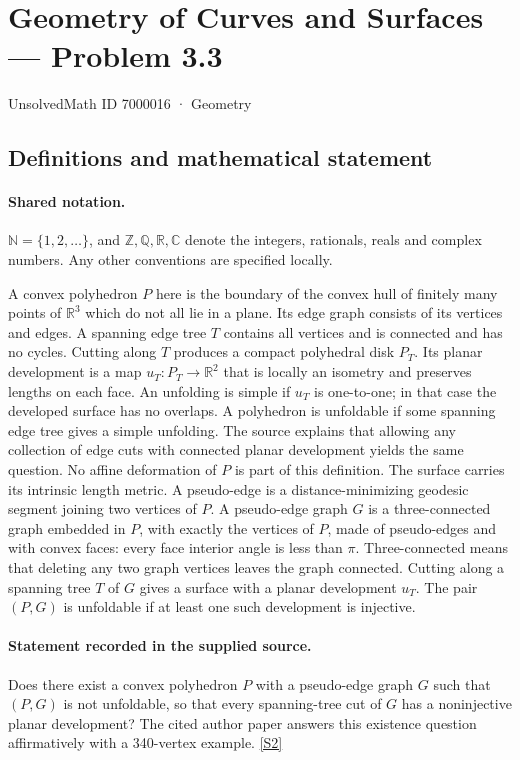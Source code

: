 \documentclass[11pt]{article}
\newcommand{\sref}[2]{\hyperlink{source:#1:#2}{[S#2]}}
\begin{document}
\setcounter{section}{7000015}
\section{Geometry of Curves and Surfaces — Problem 3.3}\label{7000016}
{\small\sffamily UnsolvedMath ID 7000016 · Geometry}
\subsection{Definitions and mathematical statement}

\paragraph{Shared notation.}$\mathbb N=\{1,2,\ldots\}$, and $\mathbb Z,\mathbb Q,\mathbb R,\mathbb C$ denote the integers, rationals, reals and complex numbers. Any other conventions are specified locally.


A convex polyhedron $P$ here is the boundary of the convex hull of finitely many points of $\mathbb R^3$ which do not all lie in a plane. Its edge graph consists of its vertices and edges. A spanning edge tree $T$ contains all vertices and is connected and has no cycles. Cutting along $T$ produces a compact polyhedral disk $P_T$. Its planar development is a map $u_T:P_T\to\mathbb R^2$ that is locally an isometry and preserves lengths on each face. An unfolding is simple if $u_T$ is one-to-one; in that case the developed surface has no overlaps. A polyhedron is unfoldable if some spanning edge tree gives a simple unfolding. The source explains that allowing any collection of edge cuts with connected planar development yields the same question. No affine deformation of $P$ is part of this definition. The surface carries its intrinsic length metric. A pseudo-edge is a distance-minimizing geodesic segment joining two vertices of $P$. A pseudo-edge graph $G$ is a three-connected graph embedded in $P$, with exactly the vertices of $P$, made of pseudo-edges and with convex faces: every face interior angle is less than $\pi$. Three-connected means that deleting any two graph vertices leaves the graph connected. Cutting along a spanning tree $T$ of $G$ gives a surface with a planar development $u_T$. The pair $(P,G)$ is unfoldable if at least one such development is injective.
\paragraph{Statement recorded in the supplied source.}
Does there exist a convex polyhedron $P$ with a pseudo-edge graph $G$ such that $(P,G)$ is not unfoldable, so that every spanning-tree cut of $G$ has a noninjective planar development? The cited author paper answers this existence question affirmatively with a 340-vertex example. \sref{7000016}{2}
\end{document}
